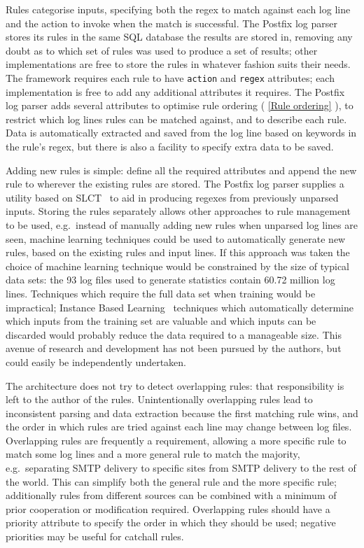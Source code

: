 \documentclass[draft]{svmult}
\newcommand{\sectionref}[1]{%
    \textsection{}\vref*{#1}%
}
\newcommand{\numberOFlogFILES}[0]{%
    93%
}
\newcommand{\numberOFlogLINEShuman}[0]{%
    60.72 million%
}
\begin{document}
Rules categorise inputs, specifying both the regex to match against each
log line and the action to invoke when the match is successful.  The
Postfix log parser stores its rules in the same SQL database the results
are stored in, removing any doubt as to which set of rules was used to
produce a set of results; other implementations are free to store the rules
in whatever fashion suits their needs.  The framework requires each rule to
have \texttt{action} and \texttt{regex} attributes; each implementation is
free to add any additional attributes it requires.  The Postfix log parser
adds several attributes to optimise rule ordering (\sectionref{Rule
ordering}), to restrict which log lines rules can be matched against, and
to describe each rule.  Data is automatically extracted and saved from the
log line based on keywords in the rule's regex, but there is also a
facility to specify extra data to be saved.

Adding new rules is simple: define all the required attributes and append
the new rule to wherever the existing rules are stored.  The Postfix log
parser supplies a utility based on SLCT~\cite{slct-paper} to aid in
producing regexes from previously unparsed inputs.  Storing the rules
separately allows other approaches to rule management to be used, e.g.\
instead of manually adding new rules when unparsed log lines are seen,
machine learning techniques could be used to automatically generate new
rules, based on the existing rules and input lines.  If this approach was
taken the choice of machine learning technique would be constrained by the
size of typical data sets: the \numberOFlogFILES{} log files used to
generate statistics contain \numberOFlogLINEShuman{} log lines.  Techniques
which require the full data set when training would be impractical;
Instance Based Learning~\cite{instance-based-learning} techniques which
automatically determine which inputs from the training set are valuable and
which inputs can be discarded would probably reduce the data required to a
manageable size.  This avenue of research and development has not been
pursued by the authors, but could easily be independently undertaken.

The architecture does not try to detect overlapping rules: that
responsibility is left to the author of the rules.  Unintentionally
overlapping rules lead to inconsistent parsing and data extraction because
the first matching rule wins, and the order in which rules are tried
against each line may change between log files.  Overlapping rules are
frequently a requirement, allowing a more specific rule to match some log
lines and a more general rule to match the majority, e.g.\ separating SMTP
delivery to specific sites from SMTP delivery to the rest of the world.
This can simplify both the general rule and the more specific rule;
additionally rules from different sources can be combined with a minimum of
prior cooperation or modification required.  Overlapping rules should have
a priority attribute to specify the order in which they should be used;
negative priorities may be useful for catchall rules.
\end{document}
